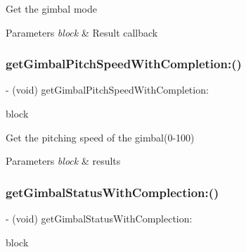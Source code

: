Get the gimbal mode


\begin{DoxyParams}{Parameters}
{\em block} & Result callback \\
\hline
\end{DoxyParams}
\mbox{\label{interface_p_v_gimabal_a3784401e0533479bf5abd8fa52c5900e}} 
\subsubsection{\texorpdfstring{get\+Gimbal\+Pitch\+Speed\+With\+Completion\+:()}{getGimbalPitchSpeedWithCompletion:()}}
{\footnotesize\ttfamily -\/ (void) get\+Gimbal\+Pitch\+Speed\+With\+Completion\+: \begin{DoxyParamCaption}\item[{(void($^\wedge$)(int speed, N\+S\+Error $\ast$\+\_\+\+Nullable error))}]{block }\end{DoxyParamCaption}}

Get the pitching speed of the gimbal(0-\/100)


\begin{DoxyParams}{Parameters}
{\em block} & results \\
\hline
\end{DoxyParams}
\mbox{\label{interface_p_v_gimabal_ab62ca2f24df0aa61a97984663767eb9c}} 
\subsubsection{\texorpdfstring{get\+Gimbal\+Status\+With\+Complection\+:()}{getGimbalStatusWithComplection:()}}
{\footnotesize\ttfamily -\/ (void) get\+Gimbal\+Status\+With\+Complection\+: \begin{DoxyParamCaption}\item[{(void($^\wedge$)(P\+V\+Gimbal\+Status gimbal\+Status, N\+S\+Error $\ast$\+\_\+\+Nullable error))}]{block }\end{DoxyParamCaption}}

